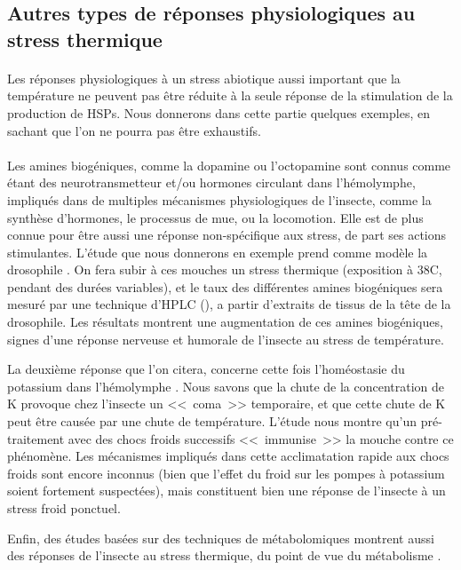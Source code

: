 		\subsection{Autres types de réponses physiologiques au stress thermique} %

		\paragraph*{}
		Les réponses physiologiques à un stress abiotique aussi important que la température ne peuvent pas être réduite à la seule réponse de la stimulation de la production de HSPs.
		Nous donnerons dans cette partie quelques exemples, en sachant que l'on ne pourra pas être exhaustifs.

		\paragraph*{}

		Les amines biogéniques, comme la dopamine ou l'octopamine sont connus comme étant des neurotransmetteur et/ou hormones circulant dans l'hémolymphe, impliqués dans de multiples mécanismes physiologiques de l'insecte, comme la synthèse d'hormones, le processus de mue, ou la locomotion.
		Elle est de plus connue pour être aussi une réponse non-spécifique aux stress, de part ses actions stimulantes.
		L'étude que nous donnerons en exemple prend comme modèle la drosophile  \cite{hirashima2000}.
		On fera subir à ces mouches un stress thermique (exposition à 38\textdegree{}C, pendant des durées variables), et le taux des différentes amines biogéniques sera mesuré par une technique d'HPLC (), a partir d'extraits de tissus de la tête de la drosophile.
		Les résultats montrent une augmentation de ces amines biogéniques, signes d'une réponse nerveuse et humorale de l'insecte au stress de température.

		La deuxième réponse que l'on citera, concerne cette fois l'homéostasie du potassium dans l'hémolymphe \cite{armstrong2012}.
		Nous savons que la chute de la concentration de K\up{+} provoque chez l'insecte un <<~coma~>> temporaire, et que cette chute de K\up{+} peut être causée par une chute de température.
		L'étude nous montre qu'un pré-traitement avec des chocs froids successifs <<~immunise~>> la mouche contre ce phénomène.
		Les mécanismes impliqués dans cette acclimatation rapide aux chocs froids sont encore inconnus (bien que l'effet du froid sur les pompes à potassium soient fortement suspectées), mais constituent bien une réponse de l'insecte à un stress froid ponctuel.

		Enfin, des études basées sur des techniques de métabolomiques montrent aussi des réponses de l'insecte au stress thermique, du point de vue du métabolisme \cite{malmendal2006}.

